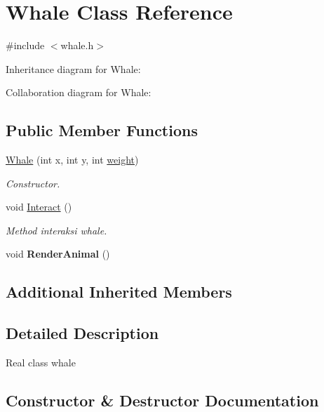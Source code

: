 \hypertarget{classWhale}{}\section{Whale Class Reference}
\label{classWhale}


{\ttfamily \#include $<$whale.\+h$>$}



Inheritance diagram for Whale\+:


Collaboration diagram for Whale\+:
\subsection*{Public Member Functions}
\begin{DoxyCompactItemize}
\item 
\hyperlink{classWhale_a00d149a599c0d568f20ca885c00d80d2}{Whale} (int x, int y, int \hyperlink{classAnimal_a9a3b22f243f7109c57f36b3c660feb6e}{weight})
\begin{DoxyCompactList}\small\item\em Constructor. \end{DoxyCompactList}\item 
void \hyperlink{classWhale_adac10dde379734b0c71fce7aa5a27be4}{Interact} ()\hypertarget{classWhale_adac10dde379734b0c71fce7aa5a27be4}{}\label{classWhale_adac10dde379734b0c71fce7aa5a27be4}

\begin{DoxyCompactList}\small\item\em Method interaksi whale. \end{DoxyCompactList}\item 
void {\bfseries Render\+Animal} ()\hypertarget{classWhale_a64773ba49e5ab23521e28e076e8ecb93}{}\label{classWhale_a64773ba49e5ab23521e28e076e8ecb93}

\end{DoxyCompactItemize}
\subsection*{Additional Inherited Members}


\subsection{Detailed Description}
Real class whale 

\subsection{Constructor \& Destructor Documentation}
